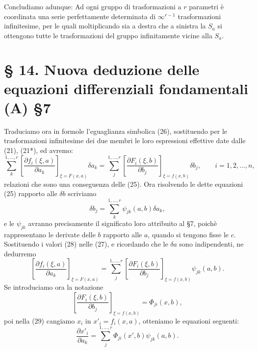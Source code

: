 \documentclass[11pt]{book}
\begin{document}
Concludiamo adunque: Ad ogni gruppo di trasformazioni a $r$ parametri è coordinata una serie perfettamente determinata di $\infty^{r-1}$ trasformazioni infinitesime, per le quali moltiplicando sia a destra che a sinistra la $S_a$ si ottengono tutte le trasformazioni del gruppo infinitamente vicine alla $S_a$.

\section*{\S{} 14. Nuova deduzione delle equazioni differenziali fondamentali (A) \S{}7}

Traduciamo ora in formole l'eguaglianza simbolica (26), sostituendo per le trasformazioni infinitesime dei due membri le loro espressioni effettive date dalle (21), (21*), ed avremo:
\begin{equation*}\tag{27}
 \sum\limits_k^{1,\ldots,r}\left[\frac{\partial f_i(\xi,a)}{\partial a_k}\right]_{\xi=F(x,a)}\delta a_k
 =
 \sum\limits_j^{1,\ldots,r}\left[\frac{\partial F_i(\xi,b)}{\partial b_j}\right]_{\xi=f(x,b)}\delta b_j,
 \qquad i=1,2,\ldots,n,
\end{equation*}
relazioni che sono una conseguenza delle (25). Ora risolvendo le dette equazioni (25) rapporto alle $\delta b$ scriviamo
\begin{equation*}\tag{28}
 \delta b_j=\sum\limits_k^{1,\ldots,r}\psi_{jk}(a,b)\delta a_k,
\end{equation*}
e le $\psi_{jk}$ avranno precisamente il significato loro attribuito al \S{}7, poichè rappresentano le derivate delle $b$ rapporto alle $a$, quando si tengono fisse le $c$. Sostituendo i valori (28) nelle (27), e ricordando che le $\delta a$ sono indipendenti, ne dedurremo
\begin{equation*}\tag{29}
 \left[\frac{\partial f_i(\xi,a)}{\partial a_k}\right]_{\xi=F(x,a)}
 =
 \sum\limits_j^{1,\ldots,r}\left[\frac{\partial F_i(\xi,b)}{\partial b_j}\right]_{\xi=f(x,b)}\psi_{jk}(a,b).
\end{equation*}
Se introduciamo ora la notazione
\begin{equation*}\tag{a}
 \left[\frac{\partial F_i(\xi,b)}{\partial b_j}\right]_{\xi=f(x,b)}=\Phi_{ji}(x,b),
\end{equation*}
poi nella (29) cangiamo $x_i$ in $x'_i=f_i(x,a)$, otteniamo le equazioni seguenti:
\begin{equation*}\tag{30}
 \frac{\partial x'_i}{\partial a_k}=\sum\limits_j^{1,\ldots,r}\Phi_{ji}(x',b)\psi_{jk}(a,b).
\end{equation*}
\end{document}
